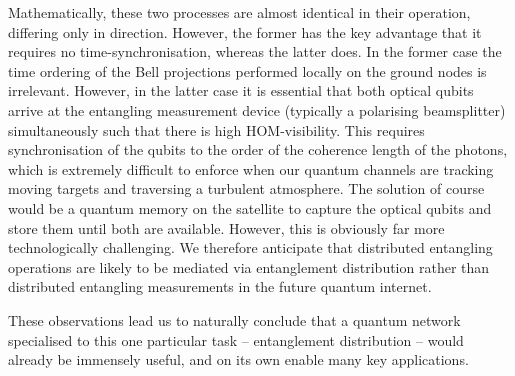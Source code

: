 Mathematically, these two processes are almost identical in their operation, differing only in direction. However, the former has the key advantage that it requires no time-synchronisation, whereas the latter does. In the former case the time ordering of the Bell projections performed locally on the ground nodes is irrelevant. However, in the latter case it is essential that both optical qubits arrive at the entangling measurement device (typically a polarising beamsplitter) simultaneously such that there is high HOM-visibility. This requires synchronisation of the qubits to the order of the coherence length of the photons, which is extremely difficult to enforce when our quantum channels are tracking moving targets and traversing a turbulent atmosphere. The solution of course would be a quantum memory on the satellite to capture the optical qubits and store them until both are available. However, this is obviously far more technologically challenging. We therefore anticipate that distributed entangling operations are likely to be mediated via entanglement distribution rather than distributed entangling measurements in the future quantum internet.

These observations lead us to naturally conclude that a quantum network specialised to this one particular task -- entanglement distribution -- would already be immensely useful, and on its own enable many key applications.
